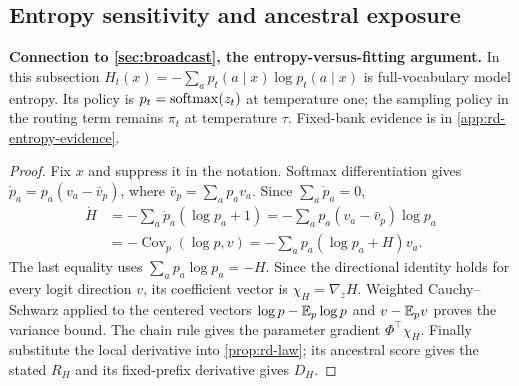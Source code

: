 \subsection{Entropy sensitivity and ancestral exposure}
\label{app:rd-entropy-response}
\textbf{Connection to \cref{sec:broadcast}, the entropy-versus-fitting argument.} In this subsection $H_t(x)=-\sum_a p_t(a\mid x)\log p_t(a\mid x)$ is full-vocabulary model entropy. Its policy is $p_t=\mathrm{softmax}(z_t)$ at temperature one; the sampling policy in the routing term remains $\pi_t$ at temperature $\tau$. Fixed-bank evidence is in \cref{app:rd-entropy-evidence}.

\begin{proof}
Fix $x$ and suppress it in the notation. Softmax differentiation gives
$\dot p_a=p_a(v_a-\bar v_p)$, where $\bar v_p=\sum_a p_av_a$. Since $\sum_a\dot p_a=0$,
\begin{align*}
 \dot H&=-\sum_a\dot p_a(\log p_a+1)
        =-\sum_a p_a(v_a-\bar v_p)\log p_a\\
       &=-\operatorname{Cov}_p(\log p,v)
        =-\sum_a p_a(\log p_a+H)v_a.
\end{align*}
The last equality uses $\sum_a p_a\log p_a=-H$. Since the directional identity holds for every logit direction $v$, its coefficient vector is $\chi_H=\nabla_zH$. Weighted Cauchy--Schwarz applied to the centered vectors $\log p-\mathbb{E}_p\log p$ and $v-\mathbb{E}_pv$ proves the variance bound. The chain rule gives the parameter gradient $\Phi^\top\chi_H$. Finally substitute the local derivative into \cref{prop:rd-law}; its ancestral score gives the stated $R_H$ and its fixed-prefix derivative gives $D_H$.
\end{proof}

